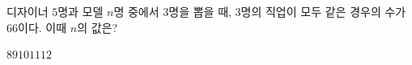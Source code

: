 \hspace*{2mm}\begin{minipage}[t]{\dimexpr\linewidth-2mm\relax}\vspace{0pt}
디자이너 $5$명과 모델 $n$명 중에서 $3$명을 뽑을 때, $3$명의 직업이 모두 같은 경우의 수가 $66$이다. 이때 $n$의 값은?
\begin{choices32}{$8$}{$9$}{$10$}{$11$}{$12$}\end{choices32}\end{minipage}
